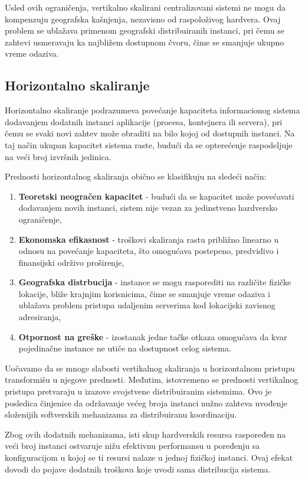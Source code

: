 Usled ovih ograničenja, vertikalno skalirani centralizovani sistemi ne mogu da kompenzuju geografska kašnjenja, nezavisno od raspoloživog hardvera. Ovaj problem se ublažava primenom geografski distribuiranih instanci, pri čemu se zahtevi usmeravaju ka najbližem dostupnom čvoru, čime se smanjuje ukupno vreme odaziva.

\subsection{Horizontalno skaliranje}
Horizontalno skaliranje podrazumeva povećanje kapaciteta informacionog sistema dodavanjem dodatnih instanci aplikacije (procesa, kontejnera ili servera), pri čemu se svaki novi zahtev može obraditi na bilo kojoj od dostupnih instanci. Na taj način ukupan kapacitet sistema raste, budući da se opterećenje raspodeljuje na veći broj izvršnih jedinica.

Prednosti horizontalnog skaliranja obično se klasifikuju na sledeći način:
\begin{enumerate}
\item \textbf{Teoretski neogračen kapacitet} - budući da se kapacitet može povećavati dodavanjem novih instanci, sistem nije vezan za jedinstveno hardversko ograničenje,
\item \textbf{Ekonomska efikasnost} - troškovi skaliranja rastu približno linearno u odnosu na povećanje kapaciteta, što omogućava postepeno, predvidivo i finansijski održivo proširenje,
\item \textbf{Geografska distrbucija} - instance se mogu rasporediti na različite fizičke lokacije, bliže krajnjim korisnicima, čime se smanjuje vreme odaziva i ublažava problem pristupa udaljenim serverima kod lokacijski zavisnog adresiranja,
\item \textbf{Otpornost na greške} - izostanak jedne tačke otkaza omogućava da kvar pojedinačne instance ne utiče na dostupnost celog sistema.
\end{enumerate}

Uočavamo da se mnoge slabosti vertikalnog skaliranja u horizontalnom pristupu transformišu u njegove prednosti. Međutim, istovremeno se prednosti vertikalnog pristupa pretvaraju u izazove svojstvene distribuiranim sistemima. Ovo je posledica činjenice da održavanje većeg broja instanci nužno zahteva uvođenje složenijih softverskih mehanizama za distribuiranu koordinaciju.

Zbog ovih dodatnih mehanizama, isti skup hardverskih resursa raspoređen na veći broj instanci ostvaruje nižu efektivnu performansu u poređenju sa konfiguracijom u kojoj se ti resursi nalaze u jednoj fizičkoj instanci. Ovaj efekat dovodi do pojave dodatnih troškova koje uvodi sama distribucija sistema.

